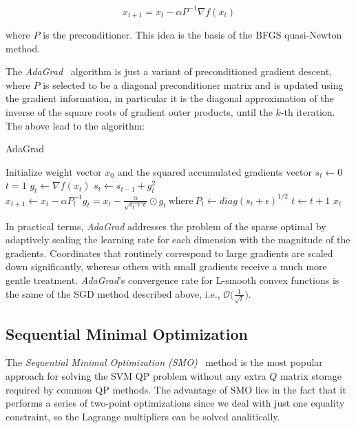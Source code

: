 $$
x_{t+1} = x_t - \alpha P^{-1} \nabla f(x_t)
$$

where $P$ is the preconditioner. This idea is the basis of the BFGS quasi-Newton method.

The \emph{AdaGrad}~\cite{duchi2011adaptive} algorithm is just a variant of preconditioned gradient descent, where $P$ is selected to be a diagonal preconditioner matrix and is updated using the gradient information, in particular it is the diagonal approximation of the inverse of the square roots of gradient outer products, until the $k$-th iteration. The above lead to the algorithm:

\begin{algorithm}[H]
	\caption{AdaGrad}
	\label{alg:adagrad}
	\begin{algorithmic}
			\State Initialize weight vector $x_0$ and the squared accumulated gradients vector $s_t \gets 0$
			\State $t = 1$
				\State $g_t \gets \nabla f(x_t)$
				\State $s_t \gets s_{t-1} + g_t^2$
				\State $x_{t+1} \gets x_t - \alpha P_t^{-1} g_t = x_t - \displaystyle \frac{\alpha}{\sqrt{s_t + \epsilon}} \odot g_t \ \text{where} \ P_t \gets diag(s_t + \epsilon)^{1/2}$
				\State $t \gets t + 1$
			\EndWhile
			\State \Return $x_t$
		\EndFunction
	\end{algorithmic}
\end{algorithm}

In practical terms, \emph{AdaGrad} addresses the problem of the sparse optimal by adaptively scaling the learning rate for each dimension with the magnitude of the gradients. Coordinates that routinely correspond to large gradients are scaled down significantly, whereas others with small gradients receive a much more gentle treatment. \emph{AdaGrad}'s convergence rate for L-smooth convex functions is the same of the SGD method described above, i.e., $\displaystyle \mathcal{O}\Big(\frac{1}{\sqrt{t}}\Big)$.

\pagebreak

\subsection{Sequential Minimal Optimization}

The \emph{Sequential Minimal Optimization (SMO)}~\cite{platt1998sequential} method is the most popular approach for solving the SVM QP problem without any extra $Q$ matrix storage required by common QP methods. The advantage of SMO lies in the fact that it performs a series of two-point optimizations since we deal with just one equality constraint, so the Lagrange multipliers can be solved analitically.

